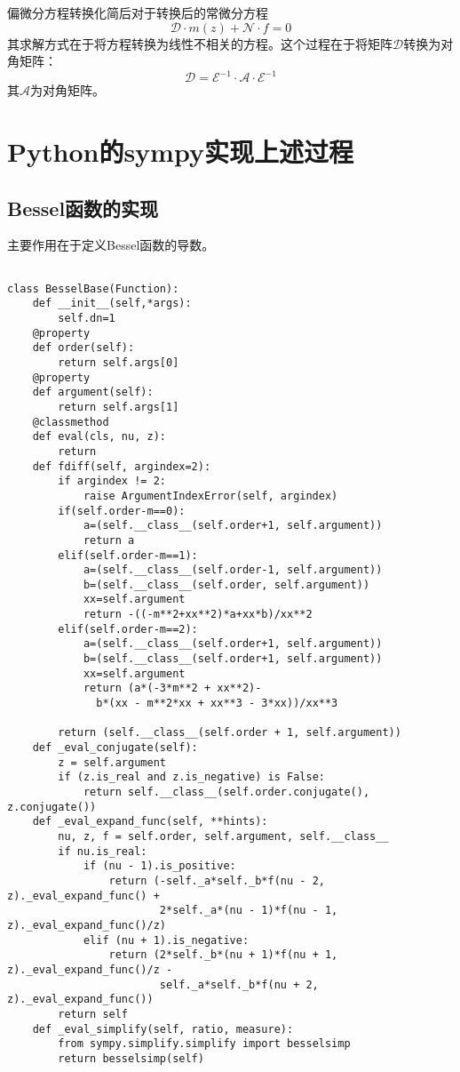 \documentclass[UTF8]{article}
\begin{document}
偏微分方程转换化简后对于转换后的常微分方程
\begin{equation}
\mathcal{D} \cdot {m}(z)+\mathcal{N} \cdot {f}=0
\end{equation}
其求解方式在于将方程转换为线性不相关的方程。这个过程在于将矩阵$\mathcal{D}$转换为对角矩阵：
\begin{equation}
\mathcal{D}=\mathcal{E}^{-1} \cdot \mathcal{A}\cdot \mathcal{E}^{-1}
\end{equation}
其$\mathcal{A}$为对角矩阵。


    \section{Python的sympy实现上述过程}
        \subsection{Bessel函数的实现}
主要作用在于定义Bessel函数的导数。

\begin{lstlisting}

class BesselBase(Function):
    def __init__(self,*args):
        self.dn=1
    @property
    def order(self):
        return self.args[0]
    @property
    def argument(self):
        return self.args[1]
    @classmethod
    def eval(cls, nu, z):
        return
    def fdiff(self, argindex=2):
        if argindex != 2:
            raise ArgumentIndexError(self, argindex)  
        if(self.order-m==0):
            a=(self.__class__(self.order+1, self.argument))
            return a
        elif(self.order-m==1):
            a=(self.__class__(self.order-1, self.argument))
            b=(self.__class__(self.order, self.argument))
            xx=self.argument
            return -((-m**2+xx**2)*a+xx*b)/xx**2
        elif(self.order-m==2):
            a=(self.__class__(self.order+1, self.argument))
            b=(self.__class__(self.order+1, self.argument))
            xx=self.argument
            return (a*(-3*m**2 + xx**2)-
              b*(xx - m**2*xx + xx**3 - 3*xx))/xx**3 
        
        return (self.__class__(self.order + 1, self.argument))
    def _eval_conjugate(self):
        z = self.argument
        if (z.is_real and z.is_negative) is False:
            return self.__class__(self.order.conjugate(), z.conjugate())
    def _eval_expand_func(self, **hints):
        nu, z, f = self.order, self.argument, self.__class__
        if nu.is_real:
            if (nu - 1).is_positive:
                return (-self._a*self._b*f(nu - 2, z)._eval_expand_func() +
                        2*self._a*(nu - 1)*f(nu - 1, z)._eval_expand_func()/z)
            elif (nu + 1).is_negative:
                return (2*self._b*(nu + 1)*f(nu + 1, z)._eval_expand_func()/z -
                        self._a*self._b*f(nu + 2, z)._eval_expand_func())
        return self
    def _eval_simplify(self, ratio, measure):
        from sympy.simplify.simplify import besselsimp
        return besselsimp(self)
\end{lstlisting}
\end{document}
